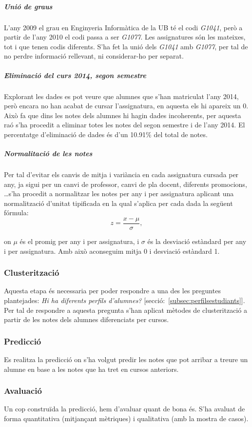 \documentclass[12pt,a4paper,catalan]{article}
\begin{document}
\subparagraph{Unió de graus}
L'any 2009 el grau en Enginyeria Informàtica de la UB té el codi \textit{G1041}, però a partir de l'any 2010 el codi passa a ser \textit{G1077}. Les assignatures són les mateixes, tot i que tenen codis diferents. S'ha fet la unió dels \textit{G1041} amb \textit{G1077}, per tal de no perdre informació rellevant, ni considerar-ho per separat.

\subparagraph{Eliminació del curs 2014, segon semestre}
Explorant les dades es pot veure que alumnes que s'han matriculat l'any 2014, però encara no han acabat de cursar l'assignatura, en aquesta els hi apareix un 0. Això fa que dins les notes dels alumnes hi hagin dades incoherents, per aquesta raó s'ha procedit a eliminar totes les notes del segon semestre i de l'any 2014. El percentatge d'eliminació de dades és d'un 10.91\% del total de notes.

\newpage

\subparagraph{Normalitació de les notes}
Per tal d'evitar els canvis de mitja i variància en cada assignatura cursada per any, ja sigui per un canvi de professor, canvi de pla docent, diferents promocions, \ldots s'ha procedit a normalitzar les notes per any i per assignatura aplicant una normalització d'unitat tipificada \cite{normtipificada} en la qual s'aplica per cada dada la següent fórmula:
$$ z = \frac{x - \mu}{\sigma}, $$

on $\mu$ és el promig per any i per assignatura, i $\sigma$ és la desviació estàndard per any i per assignatura. Amb això aconseguim mitja 0 i desviació estàndard 1.

\subsubsection{Clusterització}
Aquesta etapa és necessaria per poder respondre a una des les preguntes plantejades: \textit{Hi ha diferents perfils d'alumnes?} [secció:~\ref{subsec:perfilsestudiants}]. Per tal de  respondre a aquesta pregunta s'han aplicat mètodes de clusterització a partir de les notes dels alumnes diferenciats per cursos.

\subsubsection{Predicció}
Es realitza la predicció on s'ha volgut predir les notes que pot arribar a treure un alumne en base a les notes que ha tret en cursos anteriors.

\subsubsection{Avaluació}
Un cop construïda la predicció, hem d'avaluar quant de bona és. S'ha avaluat de forma quantitativa (mitjançant mètriques) i qualitativa (amb la mostra de casos).
\end{document}

